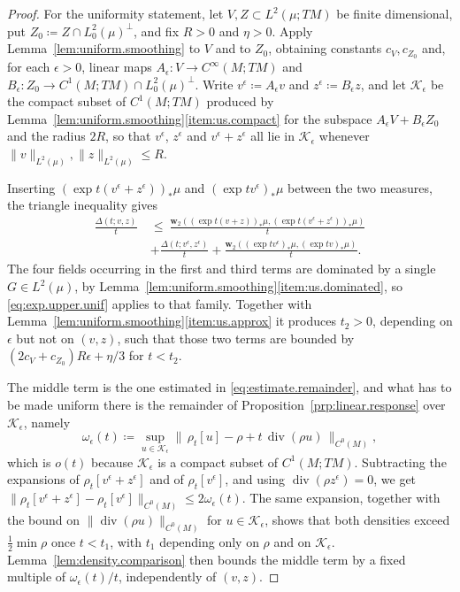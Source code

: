 \documentclass[11pt,reqno]{amsart}
\theoremstyle{plain}
\theoremstyle{definition}
\newcommand{\dw}{\mathbf{w}_2}
\DeclareMathOperator{\Div}{div}
\begin{document}
\begin{proof}
    For the uniformity statement, let \( V,Z\subset L^2(\mu;TM) \) be finite dimensional, put \( Z_0\coloneqq Z\cap L^2_0(\mu)^\perp \), and fix \( R>0 \) and \( \eta>0 \).
    Apply Lemma~\ref{lem:uniform.smoothing} to \( V \) and to \( Z_0 \), obtaining constants \( c_V,c_{Z_0} \) and, for each \( \epsilon>0 \), linear maps \( A_\epsilon:V\to C^\infty(M;TM) \) and \( B_\epsilon:Z_0\to C^1(M;TM)\cap L^2_0(\mu)^\perp \).
    Write \( v^\epsilon\coloneqq A_\epsilon v \) and \( z^\epsilon\coloneqq B_\epsilon z \), and let \( \mathcal K_\epsilon \) be the compact subset of \( C^1(M;TM) \) produced by Lemma~\ref{lem:uniform.smoothing}\ref{item:us.compact} for the subspace \( A_\epsilon V+B_\epsilon Z_0 \) and the radius \( 2R \), so that \( v^\epsilon \), \( z^\epsilon \) and \( v^\epsilon+z^\epsilon \) all lie in \( \mathcal K_\epsilon \) whenever \( \lVert v\rVert_{L^2(\mu)},\lVert z\rVert_{L^2(\mu)}\le R \).

    Inserting \( (\exp t(v^\epsilon+z^\epsilon))_\ast\mu \) and \( (\exp tv^\epsilon)_\ast\mu \) between the two measures, the triangle inequality gives
    \[
    \begin{split}
        \frac{\Delta(t;v,z)}{t}\ &\le\ \frac{\dw\left((\exp t(v+z))_\ast\mu,(\exp t(v^\epsilon+z^\epsilon))_\ast\mu\right)}{t} \\
                                 &+\frac{\Delta(t;v^\epsilon,z^\epsilon)}{t}+\frac{\dw\left((\exp tv^\epsilon)_\ast\mu,(\exp tv)_\ast\mu\right)}{t} .
    \end{split}
    \]
    The four fields occurring in the first and third terms are dominated by a single \( G\in L^2(\mu) \), by Lemma~\ref{lem:uniform.smoothing}\ref{item:us.dominated}, so \eqref{eq:exp.upper.unif} applies to that family.
    Together with Lemma~\ref{lem:uniform.smoothing}\ref{item:us.approx} it produces \( t_2>0 \), depending on \( \epsilon \) but not on \( (v,z) \), such that those two terms are bounded by \( (2c_V+c_{Z_0})R\epsilon+\eta/3 \) for \( t<t_2 \).

    The middle term is the one estimated in \eqref{eq:estimate.remainder}, and what has to be made uniform there is the remainder of Proposition~\ref{prp:linear.response} over \( \mathcal K_\epsilon \), namely
    \[
        \omega_\epsilon(t)\coloneqq\sup_{u\in\mathcal K_\epsilon}\big\lVert\,\rho_t[u]-\rho+t\,\Div(\rho u)\,\big\rVert_{C^0(M)} ,
    \]
    which is \( o(t) \) because \( \mathcal K_\epsilon \) is a compact subset of \( C^1(M;TM) \).
    Subtracting the expansions of \( \rho_t[v^\epsilon+z^\epsilon] \) and of \( \rho_t[v^\epsilon] \), and using \( \Div(\rho z^\epsilon)=0 \), we get \( \lVert\rho_t[v^\epsilon+z^\epsilon]-\rho_t[v^\epsilon]\rVert_{C^0(M)}\le2\omega_\epsilon(t) \).
    The same expansion, together with the bound on \( \lVert\Div(\rho u)\rVert_{C^0(M)} \) for \( u\in\mathcal K_\epsilon \), shows that both densities exceed \( \tfrac12\min\rho \) once \( t<t_1 \), with \( t_1 \) depending only on \( \rho \) and on \( \mathcal K_\epsilon \).
    Lemma~\ref{lem:density.comparison} then bounds the middle term by a fixed multiple of \( \omega_\epsilon(t)/t \), independently of \( (v,z) \).


\end{proof}
\end{document}
